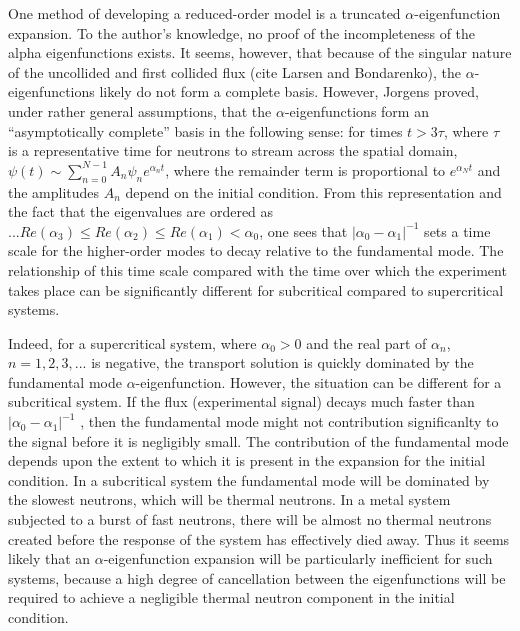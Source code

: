 \documentclass[12pt]{article}
\begin{document}
One method of developing a reduced-order model is a truncated $\alpha$-eigenfunction expansion. To the author's knowledge, no proof of the
incompleteness of the alpha eigenfunctions exists. It seems, however, that because of the singular nature of the uncollided and first
collided flux (cite Larsen and Bondarenko), the $\alpha$-eigenfunctions likely do not form a complete basis. However, Jorgens proved, under
 rather general assumptions, that the $\alpha$-eigenfunctions form an ``asymptotically complete'' basis in the following sense: for times $t>3\tau$, where $\tau$ is a
representative time for neutrons to stream across the spatial domain, $\psi\left(t\right) \sim \sum_{n=0}^{N-1} A_n \psi_n e^{\alpha_n t}$, where the
remainder term is proportional to $e^{\alpha_N t}$ and the amplitudes $A_n$ depend on the initial condition. From this representation and the fact that the
eigenvalues are ordered as $...Re\left(\alpha_3\right)\le Re\left(\alpha_2\right)\le Re\left(\alpha_1\right) < \alpha_0$, one sees that $|\alpha_0 -
\alpha_1|^{-1}$ sets a time scale for the higher-order modes to decay relative to the fundamental mode. The relationship of this time scale compared with 
the time over which the experiment takes place can be significantly different for subcritical compared to supercritical systems.  

Indeed, for a supercritical system, where $\alpha_0 > 0$ and the real part of $\alpha_n$, $n=1,2,3,...$ is negative, the transport
solution is quickly dominated by the fundamental mode $\alpha$-eigenfunction. However, the 
situation can be different for a subcritical system. If the flux (experimental signal) decays much faster than $|\alpha_0 -
\alpha_1|^{-1}$ , then the fundamental mode might not contribution significanlty to the signal before it is negligibly small. The contribution of the 
fundamental mode depends upon the extent to which it is present in the expansion for the initial condition. In 
a subcritical system the fundamental mode will be dominated by the slowest neutrons, which will be thermal 
neutrons. In a metal system subjected to a burst of fast neutrons, there will be almost no thermal neutrons 
created before the response of the system has effectively died away.  Thus it seems likely that an $\alpha$-eigenfunction expansion 
will be particularly inefficient for such systems, because a high degree of cancellation between the eigenfunctions 
will be required to achieve a negligible thermal neutron component in the initial condition.  
\end{document}
